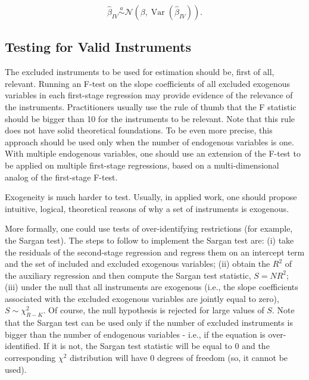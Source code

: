 $$
\widehat{\beta}_{I V} \stackrel{a}{\sim} \mathcal{N}\left(\beta, \operatorname{Var}\left(\widehat{\beta}_{I V}\right)\right) .
$$

\subsection{Testing for Valid Instruments}
The excluded instruments to be used for estimation should be, first of all, relevant. Running an F-test on the slope coefficients of all excluded exogenous variables in each first-stage regression may provide evidence of the relevance of the instruments. Practitioners usually use the rule of thumb that the F statistic should be bigger than 10 for the instruments to be relevant. Note that this rule does not have solid theoretical foundations. To be even more precise, this approach should be used only when the number of endogenous variables is one. With multiple endogenous variables, one should use an extension of the F-test to be applied on multiple first-stage regressions, based on a multi-dimensional analog of the first-stage F-test.

Exogeneity is much harder to test. Usually, in applied work, one should propose intuitive, logical, theoretical reasons of why a set of instruments is exogenous.

More formally, one could use tests of over-identifying restrictions (for example, the Sargan test). The steps to follow to implement the Sargan test are: (i) take the residuals of the second-stage regression and regress them on an intercept term and the set of included and excluded exogenous variables; (ii) obtain the $R^{2}$ of the auxiliary regression and then compute the Sargan test statistic, $S=N R^{2}$; (iii) under the null that all instruments are exogenous (i.e., the slope coefficients associated with the excluded exogenous variables are jointly equal to zero), $S \sim \chi_{R-K}^{2}$. Of course, the null hypothesis is rejected for large values of $S$. Note that the Sargan test can be used only if the number of excluded instruments is bigger than the number of endogenous variables - i.e., if the equation is over-identified. If it is not, the Sargan test statistic will be equal to 0 and the corresponding $\chi^{2}$ distribution will have 0 degrees of freedom (so, it cannot be used).
